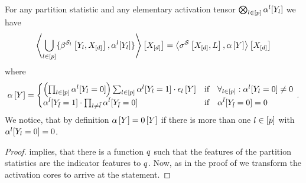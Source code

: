 \begin{theorem}
    \label{the:selectionRepresentationPartitionStatistics}
    For any partition statistic and any elementary activation tensor $\bigotimes_{l\in[p]}\alpha^{l}[Y_{l}]$ we have
    \begin{align*}
        \left\langle \bigcup_{l\in[p]}\{\beta^{\mathcal{S}_{l}}\left[Y_{l},X_{[d]}\right],\alpha^{l}[Y_{l}]\}\right\rangle \left[ X_{[d]} \right]
        = \left\langle \sigma^{\mathcal{S}}\left[X_{[d]},L\right],\alpha\left[Y\right]\right\rangle \left[ X_{[d]} \right]
    \end{align*}
    where
    \begin{align*}
        \actcoreat{\headvariable}
        =
        \begin{cases}
            \left(\prod_{\selindexin} \actcoreofat{\selindex}{\headvariableof{\selindex}=0} \right) \sum_{\selindexin}\actcoreofat{\selindex}{\headvariableof{\selindex}=1} \cdot \onehotmapofat{\selindex}{\headvariable}
            & \text{if} \quad \forall_{\selindexin} : \actcoreofat{\selindex}{\headvariableof{\selindex}=0}\neq 0 \\
            \actcoreofat{\secselindex}{\headvariableof{\secselindex}=1} \cdot \prod_{\selindex\neq\secselindex}\actcoreofat{\secselindex}{\headvariableof{\secselindex}=0}
            & \text{if} \quad \actcoreofat{\secselindex}{\headvariableof{\secselindex}=0}=0 %
        \end{cases} \, .
    \end{align*}
    We notice, that by definition $\alpha\left[Y\right]=0\left[Y\right]$ if there is more than one $l\in[p]$ with $\alpha^{l}[Y_{l}=0]=0$.
\end{theorem}
\begin{proof}
     implies, that there is a function $q$ such that the features of the partition statistics are the indicator features to $q$.
    Now, as in the proof of  we transform the activation cores to arrive at the statement.
\end{proof}

